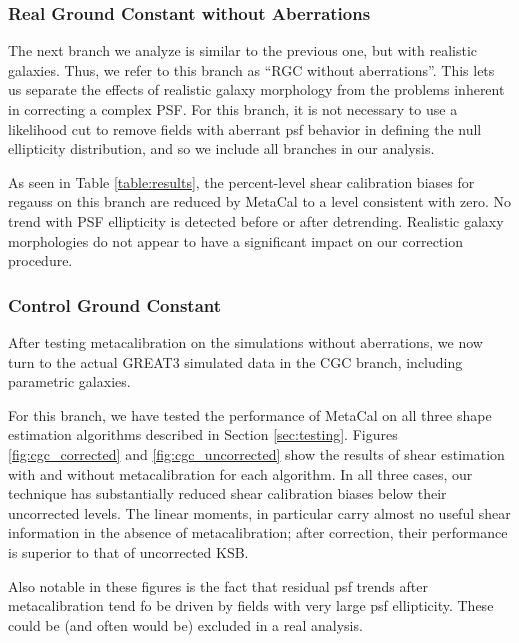 \documentclass[iop]{emulateapj}
\begin{document}
\subsubsection{Real Ground Constant without Aberrations}

The next branch we analyze is similar to the previous one, but with
realistic galaxies.  Thus, we refer to this branch as ``RGC without
aberrations''. This lets us separate the effects of realistic galaxy
morphology from the problems inherent in correcting a complex PSF. For
this branch, it is not necessary to use a likelihood cut to remove
fields with aberrant psf behavior in defining the null ellipticity
distribution, and so we include all branches in our analysis.

As seen in Table \ref{table:results}, the percent-level shear
calibration biases for regauss on this branch are reduced by MetaCal
to a level consistent with zero. No trend with PSF ellipticity is
detected before or after detrending. Realistic galaxy morphologies do
not appear to have a significant impact on our correction procedure.


\subsubsection{Control Ground Constant}

After testing metacalibration on the simulations without aberrations,
we now turn to the actual GREAT3 simulated data in the CGC branch,
including parametric galaxies.

For this branch, we have tested the performance of MetaCal on all
three shape estimation algorithms described in Section
\ref{sec:testing}. Figures \ref{fig:cgc_corrected} and
\ref{fig:cgc_uncorrected} show the results of shear estimation with
and without metacalibration for each algorithm. In all three cases,
our technique has substantially reduced shear calibration biases below
their uncorrected levels. The linear moments, in particular carry
almost no useful shear information in the absence of metacalibration;
after correction, their performance is superior to that of uncorrected
KSB.

Also notable in these figures is the fact that residual psf trends
after metacalibration tend fo be driven by fields with very large psf
ellipticity. These could be (and often would be) excluded in a real
analysis. 
\end{document}
